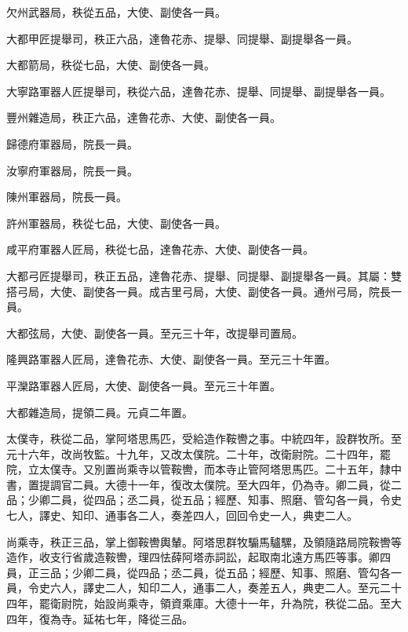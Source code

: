 \begin{pinyinscope}
 欠州武器局，秩從五品，大使、副使各一員。



 大都甲匠提舉司，秩正六品，達魯花赤、提舉、同提舉、副提舉各一員。



 大都箭局，秩從七品，大使、副使各一員。



 大寧路軍器人匠提舉司，秩從六品，達魯花赤、提舉、同提舉、副提舉各一員。



 豐州雜造局，秩正六品，達魯花赤、大使、副使各一員。



 歸德府軍器局，院長一員。



 汝寧府軍器局，院長一員。



 陳州軍器局，院長一員。



 許州軍器局，秩從七品，大使、副使各一員。



 咸平府軍器人匠局，秩從七品，達魯花赤、大使、副使各一員。



 大都弓匠提舉司，秩正五品，達魯花赤、提舉、同提舉、副提舉各一員。其屬：雙搭弓局，大使、副使各一員。成吉里弓局，大使、副使各一員。通州弓局，院長一員。



 大都弦局，大使、副使各一員。至元三十年，改提舉司置局。



 隆興路軍器人匠局，達魯花赤、大使、副使各一員。至元三十年置。



 平灤路軍器人匠局，大使、副使各一員。至元三十年置。



 大都雜造局，提領二員。元貞二年置。



 太僕寺，秩從二品，掌阿塔思馬匹，受給造作鞍轡之事。中統四年，設群牧所。至元十六年，改尚牧監。十九年，又改太僕院。二十年，改衛尉院。二十四年，罷院，立太僕寺。又別置尚乘寺以管鞍轡，而本寺止管阿塔思馬匹。二十五年，隸中書，置提調官二員。大德十一年，復改太僕院。至大四年，仍為寺。卿二員，從二品；少卿二員，從四品；丞二員，從五品；經歷、知事、照磨、管勾各一員，令史七人，譯史、知印、通事各二人，奏差四人，回回令史一人，典吏二人。



 尚乘寺，秩正三品，掌上御鞍轡輿輦。阿塔思群牧騸馬驢騾，及領隨路局院鞍轡等造作，收支行省歲造鞍轡，理四怯薛阿塔赤詞訟，起取南北遠方馬匹等事。卿四員，正三品；少卿二員，從四品；丞二員，從五品；經歷、知事、照磨、管勾各一員，令史六人，譯史二人，知印二人，通事二人，奏差五人，典吏二人。至元二十四年，罷衛尉院，始設尚乘寺，領資乘庫。大德十一年，升為院，秩從二品。至大四年，復為寺。延祐七年，降從三品。




\end{pinyinscope}
